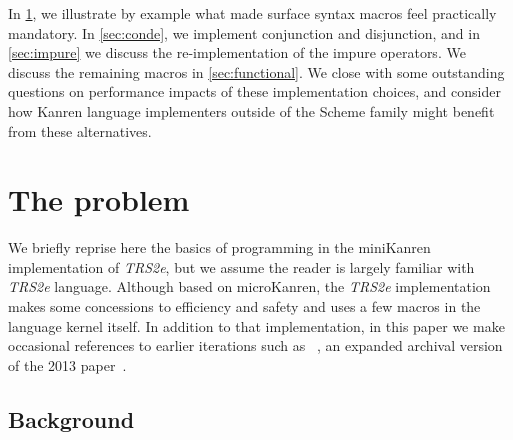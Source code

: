 \documentclass[sigplan,balance=true,pbalance=true,natbib=false]{acmart}
\begin{document}
In \cref{sec:all-aboard}, we illustrate by example what made surface
syntax macros feel practically mandatory. In \cref{sec:conde}, we
implement conjunction and disjunction, and in \cref{sec:impure} we
discuss the re-implementation of the impure operators. We discuss the
remaining macros in \cref{sec:functional}. We close with some
outstanding questions on performance impacts of these implementation
choices, and consider how Kanren language implementers outside of the
Scheme family might benefit from these alternatives.

\section{The problem}\label{sec:all-aboard}

We briefly reprise here the basics of programming in the miniKanren
implementation of \emph{TRS2e}, but we assume the reader is largely
familiar with \emph{TRS2e} language. Although based on microKanren,
the \emph{TRS2e} implementation makes some concessions to efficiency
and safety and uses a few macros in the language kernel itself. In
addition to that implementation, in this paper we make occasional
references to earlier iterations such as
\citeauthor{hemann2016small}~\cite{hemann2016small}, an expanded
archival version of the 2013 paper~\cite{hemann2013muKanren}.

\subsection{Background}
\end{document}
